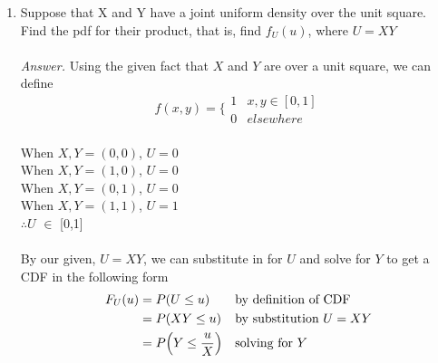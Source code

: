 \documentclass[11pt]{article}
\begin{document}
\begin{enumerate}
\begin{enumerate}[(a)]
\begin{proof}
\begin{align}
{                }
                \bigg] 
                \notag
                \text{ Factor out \(\alpha \beta\)}
                \\\notag\\&=
                \frac
                {
                    n \alpha \beta
                    (\alpha + \beta + n)
                }
                {
                    (\alpha + \beta)^2 (\alpha + \beta + 1)
                }
                \notag
                \text{ Multiply in the \(n\)}
            \end{align}
            $$\boxed{\therefore Var(Y) = 
            \frac
            {
                n \alpha \beta (\alpha + \beta + n)
            }
            {
                (\alpha + \beta)^2 (\alpha + \beta + 1)
            }}$$
        \end{proof}
    \end{enumerate}
    \item Suppose that X and Y have a joint uniform density over the unit square. Find the pdf for their product, that is, find \(f_U(u)\), where \(U = X Y\)
    \\\\\emph{Answer.} Using the given fact that \(X\) and \(Y\) are over a unit square, we can define
    $$f(x, y) = \Bigg\{ \begin{array}{cc}
    1 & x, y \in [0, 1]\\
    0 & elsewhere\end{array}$$
    \\When \(X, Y = (0, 0)\), \(U = 0\)
    \\When \(X, Y = (1, 0)\), \(U = 0\)
    \\When \(X, Y = (0, 1)\), \(U = 0\)
    \\When \(X, Y = (1, 1)\), \(U = 1\)
    \\\(\therefore U\) \(\in\) [0,1]\\
        \\By our given, \(U = XY\), we can substitute in for \(U\) and solve for \(Y\) to get a CDF in the following form\\
     \begin{align}
                F_U(u) &= P(U \leq u) \notag && \text{by definition of CDF}
                \\&= P( X Y \leq u) \notag && \text{by substitution \(U = X Y\)}
                \\&= P\Big(Y \leq \frac{u}{X}\Big) \notag && \text{solving for \(Y\)}

\end{align}
\end{enumerate}
\end{document}
